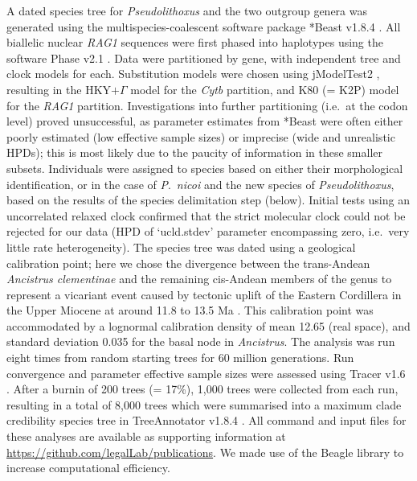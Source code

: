 \documentclass[12pt]{article}
\begin{document}
A dated species tree for \emph{Pseudolithoxus} and the two outgroup genera was generated using the multispecies-coalescent software package *Beast v1.8.4 \citep{Heled2010}. %
All biallelic nuclear \emph{RAG1} sequences were first phased into haplotypes using the software Phase v2.1 \citep{Stephens2003}. %
Data were partitioned by gene, with independent tree and clock models for each. %
Substitution models were chosen using jModelTest2 \citep{Darriba2012}, resulting in the HKY$+\Gamma$ model for the \emph{Cytb} partition, and K80 (= K2P) model for the \emph{RAG1} partition. %
Investigations into further partitioning (i.e.\ at the codon level) proved unsuccessful, as parameter estimates from *Beast were often either poorly estimated (low effective sample sizes) or imprecise (wide and unrealistic HPDs); this is most likely due to the paucity of information in these smaller subsets. %
Individuals were assigned to species based on either their morphological identification, or in the case of \emph{P}.\ \emph{nicoi} and the new species of \emph{Pseudolithoxus}, based on the results of the species delimitation step (below). %
Initial tests using an uncorrelated relaxed clock confirmed that the strict molecular clock could not be rejected for our data (HPD of `ucld.stdev' parameter encompassing zero, i.e.\ very little rate heterogeneity). %
The species tree was dated using a geological calibration point; here we chose the divergence between the trans-Andean \emph{Ancistrus clementinae} and the remaining cis-Andean members of the genus to represent a vicariant event caused by tectonic uplift of the Eastern Cordillera in the Upper Miocene at around 11.8 to 13.5 Ma \citep{Albert2011}. %
This calibration point was accommodated by a lognormal calibration density of mean 12.65 (real space), and standard deviation 0.035 for the basal node in \emph{Ancistrus}. %
The analysis was run eight times from random starting trees for 60 million generations. %
Run convergence and parameter effective sample sizes were assessed using Tracer v1.6 \citet{Rambaut2014}. %
After a burnin of 200 trees (= 17\%), 1,000 trees were collected from each run, resulting in a total of 8,000 trees which were summarised into a maximum clade credibility species tree in TreeAnnotator v1.8.4 \citep{Rambaut2016}. %
All command and input files for these analyses are available as supporting information at \href{https://github.com/legalLab/publications}{https://github.com/legalLab/publications}. %
We made use of the Beagle library \citep{Ayres2012} to increase computational efficiency.%
\end{document}
